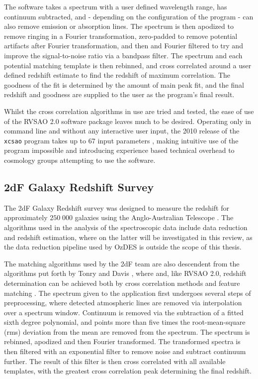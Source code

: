 \documentclass[titlesmallcaps, examinerscopy, copyrightpage]{uqthesis}
\begin{document}
The software takes a spectrum with a user defined wavelength range, has continuum subtracted, and - depending on the configuration of the program - can also remove emission or absorption lines. The spectrum is then apodized to remove ringing in a Fourier transformation, zero-padded to remove potential artifacts after Fourier transformation, and then and Fourier filtered to try and improve the signal-to-noise ratio via a bandpass filter. The spectrum and each potential matching template is then rebinned, and cross correlated around a user defined redshift estimate to find the redshift of maximum correlation. The goodness of the fit is determined by the amount of main peak fit, and the final redshift and goodness are supplied to the user as the program's final result.

Whilst the cross correlation algorithms in use are tried and tested, the ease of use of the RVSAO 2.0 software package leaves much to be desired. Operating only in command line and without any interactive user input, the 2010 release of the \verb+xcsao+ program takes up to 67 input parameters \cite{parameters}, making intuitive use of the program impossible and introducing experience based technical overhead to cosmology groups attempting to use the software.

\subsection{2dF Galaxy Redshift Survey}
The 2dF Galaxy Redshift survey was designed to measure the redshift for approximately $250\;000$ galaxies using the Anglo-Australian Telescope \cite{colless20012df}. The algorithms used in the analysis of the spectroscopic data include data reduction and redshift estimation, where on the latter will be investigated in this review, as the data reduction pipeline used by OzDES is outside the scope of this thesis.

The matching algorithms used by the 2dF team are also descendent from the algorithms put forth by Tonry and Davis \cite{tonry1979survey}, where and, like RVSAO 2.0, redshift determination can be achieved both by cross correlation methods and feature matching \cite{colless20012df}. The spectrum given to the application first undergoes several steps of preprocessing, where detected atmospheric lines are removed via interpolation over a spectrum window. Continuum is removed via the subtraction of a fitted sixth degree polynomial, and points more than five times the root-mean-square (rms) deviation from the mean are removed from the spectrum. The spectrum is rebinned, apodized and then Fourier transformed. The transformed spectra is then filtered with an exponential filter to remove noise and subtract continuum further. The result of this filter is then cross correlated with all available templates, with the greatest cross correlation peak determining the final redshift.
\end{document}
